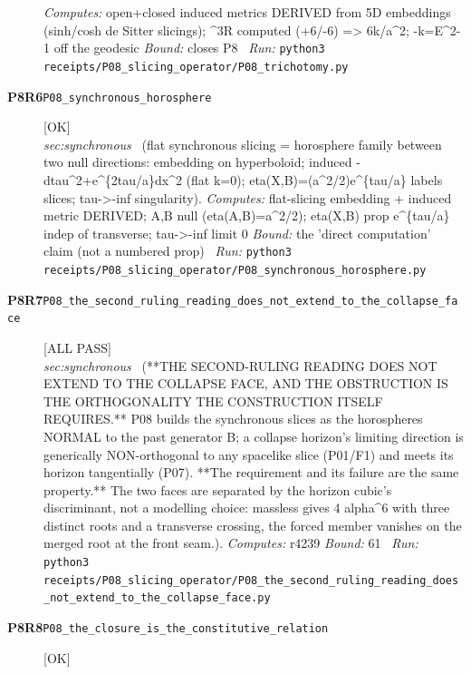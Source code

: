 \begin{description}
\emph{Computes:} open+closed induced metrics DERIVED from 5D embeddings (sinh/cosh de Sitter slicings); \textasciicircum{}3R computed (+6/-6) => 6k/a\textasciicircum{}2; -k=E\textasciicircum{}2-1 off the geodesic
 \emph{Bound:} closes P8
\ \emph{Run:} \texttt{python3 receipts/P08\_slicing\_operator/P08\_trichotomy.py}
\item[\rcptlabel{P08_synchronous_horosphere}{P8R6}\textbf{P8R6}\quad\texttt{P08\_synchronous\_horosphere}]\hfill\textsf{[OK]}\\
\textit{sec:synchronous} \ (flat synchronous slicing = horosphere family between two null directions: embedding on hyperboloid; induced -dtau\textasciicircum{}2+e\textasciicircum{}\{2tau/a\}dx\textasciicircum{}2 (flat k=0); eta(X,B)=(a\textasciicircum{}2/2)e\textasciicircum{}\{tau/a\} labels slices; tau->-inf singularity). 
\emph{Computes:} flat-slicing embedding + induced metric DERIVED; A,B null (eta(A,B)=a\textasciicircum{}2/2); eta(X,B) prop e\textasciicircum{}\{tau/a\} indep of transverse; tau->-inf limit 0
 \emph{Bound:} the 'direct computation' claim (not a numbered prop)
\ \emph{Run:} \texttt{python3 receipts/P08\_slicing\_operator/P08\_synchronous\_horosphere.py}
\item[\rcptlabel{P08_the_second_ruling_reading_does_not_extend_to_the_collapse_face}{P8R7}\textbf{P8R7}\quad\texttt{P08\_the\_second\_ruling\_reading\_does\_not\_extend\_to\_the\_collapse\_face}]\hfill\textsf{[ALL PASS]}\\
\textit{sec:synchronous} \ (**THE SECOND-RULING READING DOES NOT EXTEND TO THE COLLAPSE FACE, AND THE OBSTRUCTION IS THE ORTHOGONALITY THE CONSTRUCTION ITSELF REQUIRES.** P08 builds the synchronous slices as the horospheres NORMAL to the past generator B; a collapse horizon's limiting direction is generically NON-orthogonal to any spacelike slice (P01/F1) and meets its horizon tangentially (P07). **The requirement and its failure are the same property.** The two faces are separated by the horizon cubic's discriminant, not a modelling choice: massless gives 4 alpha\textasciicircum{}6 with three distinct roots and a transverse crossing, the forced member vanishes on the merged root at the front seam.). 
\emph{Computes:} r4239
 \emph{Bound:} 61
\ \emph{Run:} \texttt{python3 receipts/P08\_slicing\_operator/P08\_the\_second\_ruling\_reading\_does\_not\_extend\_to\_the\_collapse\_face.py}
\item[\rcptlabel{P08_the_closure_is_the_constitutive_relation}{P8R8}\textbf{P8R8}\quad\texttt{P08\_the\_closure\_is\_the\_constitutive\_relation}]\hfill\textsf{[OK]}\\

\end{description}
